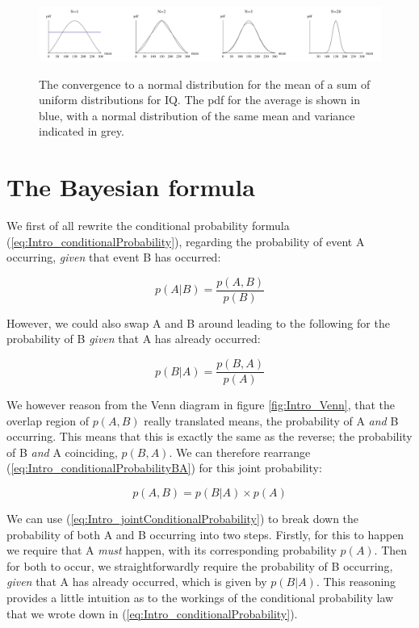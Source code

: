 \documentclass[11pt,fullpage]{book}
\begin{document}
\begin{figure}
\centering
\scalebox{0.4} 
{\includegraphics{Intro_CLTNormalSum.pdf}}
\caption{The convergence to a normal distribution for the mean of a sum of uniform distributions for IQ. The pdf for the average is shown in blue, with a normal distribution of the same mean and variance indicated in grey.}\label{fig:Intro_CLTNormalSum}
\end{figure}

\section{The Bayesian formula}\label{sec:Intro_BayesianFormula}
We first of all rewrite the conditional probability formula (\ref{eq:Intro_conditionalProbability}), regarding the probability of event A occurring, \textit{given} that event B has occurred:

\begin{equation}\label{eq:Intro_conditionalProbabilityAB}
p(A|B) = \frac{p(A,B)}{p(B)}
\end{equation}

However, we could also swap A and B around leading to the following for the probability of B \textit{given} that A has already occurred:

\begin{equation}\label{eq:Intro_conditionalProbabilityBA}
p(B|A) = \frac{p(B,A)}{p(A)}
\end{equation}

We however reason from the Venn diagram in figure \ref{fig:Intro_Venn}, that the overlap region of $p(A,B)$ really translated means, the probability of A \textit{and} B occurring. This means that this is exactly the same as the reverse; the probability of B \textit{and} A coinciding, $p(B,A)$. We can therefore rearrange (\ref{eq:Intro_conditionalProbabilityBA}) for this joint probability:

\begin{equation}\label{eq:Intro_jointConditionalProbability}
p(A,B) = p(B|A)\times p(A)
\end{equation}

We can use (\ref{eq:Intro_jointConditionalProbability}) to break down the probability of both A and B occurring into two steps. Firstly, for this to happen we require that A \textit{must} happen, with its corresponding probability $p(A)$. Then for both to occur, we straightforwardly require the probability of B occurring, \textit{given} that A has already occurred, which is given by $p(B|A)$. This reasoning provides a little intuition as to the workings of the conditional probability law that we wrote down in (\ref{eq:Intro_conditionalProbability}).
\end{document}

